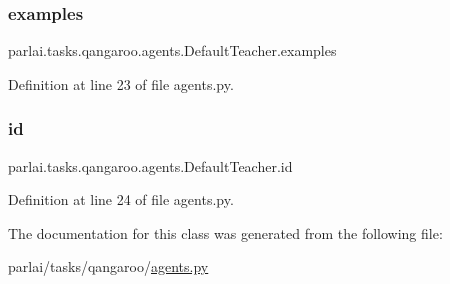 \subsubsection{\texorpdfstring{examples}{examples}}
{\footnotesize\ttfamily parlai.\+tasks.\+qangaroo.\+agents.\+Default\+Teacher.\+examples}



Definition at line 23 of file agents.\+py.

\mbox{\label{classparlai_1_1tasks_1_1qangaroo_1_1agents_1_1DefaultTeacher_a4d036962beeb5b5d446bf04327e49014}} 
\subsubsection{\texorpdfstring{id}{id}}
{\footnotesize\ttfamily parlai.\+tasks.\+qangaroo.\+agents.\+Default\+Teacher.\+id}



Definition at line 24 of file agents.\+py.



The documentation for this class was generated from the following file\+:\begin{DoxyCompactItemize}
\item 
parlai/tasks/qangaroo/\hyperlink{parlai_2tasks_2qangaroo_2agents_8py}{agents.\+py}\end{DoxyCompactItemize}
